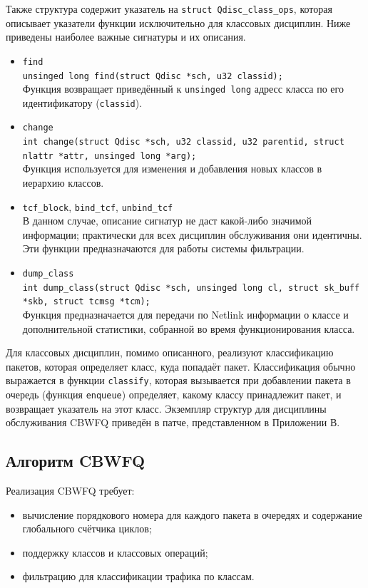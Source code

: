 	Также структура содержит указатель на \lstinline{struct Qdisc_class_ops},
	которая описывает указатели функции исключительно для классовых дисциплин.
	Ниже приведены наиболее важные сигнатуры и их описания.
	\begin{itemize}
		\item \lstinline{find}\\
			\lstinline{unsinged long find(struct Qdisc *sch, u32 classid);}\\
			Функция возвращает приведённый к \lstinline{unsinged long} адресс класса по его идентификатору (\lstinline{classid}).
		\item \lstinline{change} \\
			\lstinline{int change(struct Qdisc *sch, u32 classid, u32 parentid, struct nlattr *attr, unsinged long *arg);}\\
			Функция используется для изменения и добавления новых классов в иерархию классов. 
		\item \lstinline{tcf_block}, \lstinline{bind_tcf}, \lstinline{unbind_tcf}\\
			В данном случае, описание сигнатур не даст какой-либо значимой информации; практически
			для всех дисциплин обслуживания они идентичны. Эти функции предназначаются для работы
			системы фильтрации.
		\item \lstinline{dump_class}\\
			\lstinline{int dump_class(struct Qdisc *sch, unsinged long cl, struct sk_buff *skb, struct tcmsg *tcm);} \\
			Функция предназначается для передачи по Netlink информации о классе и дополнительной статистики, собранной
			во время функционирования класса.
	\end{itemize}

	Для классовых дисциплин, помимо описанного, реализуют классификацию пакетов, которая
	определяет класс, куда попадаёт пакет. Классификация обычно выражается в функции \lstinline{classify},
	которая вызывается при добавлении пакета в очередь (функция \lstinline{enqueue}) определяет, какому классу
	 принадлежит пакет, и возвращает указатель на этот класс.
	Экземпляр структур для дисциплины обслуживания CBWFQ приведён в патче, представленном в Приложении В.

	\subsection{Алгоритм CBWFQ}

		Реализация CBWFQ требует:
		\begin{itemize}
			\item вычисление порядкового номера для каждого пакета в очередях и содержание глобального счётчика циклов;
			\item поддержку классов и классовых операций;
			\item фильтрацию для классификации трафика по классам.
		\end{itemize}

